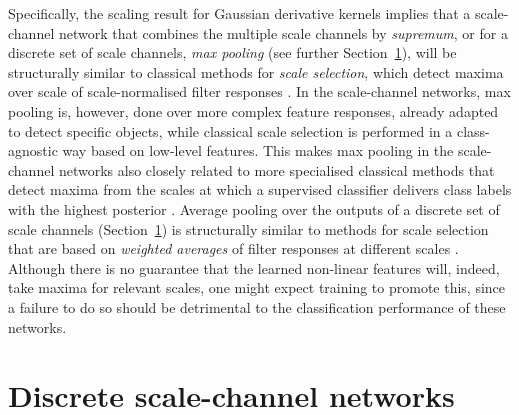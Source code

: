 \documentclass[twocolumn,runningheads]{svjour3}
\begin{document}
Specifically, the scaling result for Gaussian derivative kernels implies that 
a scale-channel network that
combines the multiple scale channels by {\em supremum\/}, or for a discrete set of scale channels,
{\em max pooling\/} (see further Section~\ref{sec-discrete-scale-channels}), will be structurally similar to classical methods for
{\em scale selection\/}, which detect maxima over scale of
scale-normalised filter responses
\cite{Lin97-IJCV,Lin98-IJCV,Lin21-EncCompVis}. In the scale-channel networks, max pooling is,
however, done over more complex feature responses, already adapted to
detect specific objects, while classical scale selection is performed
in a class-agnostic way based on low-level features. This makes
max pooling in the scale-channel networks also closely related to more
specialised classical methods that detect maxima from the scales at
which a supervised classifier delivers class labels with the highest
posterior \cite{LiTaxLoo11-ScSp,LooLiTax09-LNCS}. 
Average pooling over the outputs of a discrete set of scale channels
(Section~\ref{sec-discrete-scale-channels}) is structurally similar to
methods for scale selection that are based on {\em weighted averages\/}
of filter responses at different scales
\cite{Lin12-JMIV,Lin15-JMIV}. Although there is no
guarantee that the learned non-linear features will, indeed, take
maxima for relevant scales, one might expect training to promote this,
since a failure to do so should be detrimental to the classification
performance of these networks.


\section{Discrete scale-channel networks}
\label{sec-discrete-scale-channels}
\end{document}
